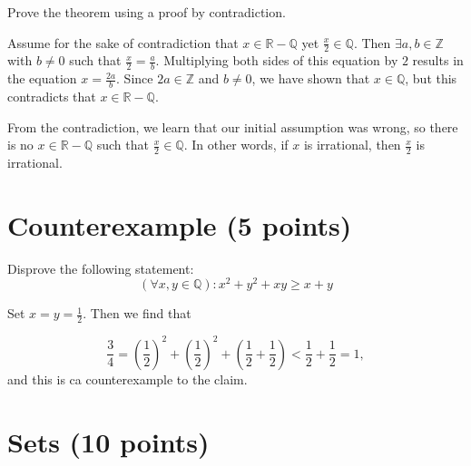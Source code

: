 \documentclass[11pt]{article}
\def\Q{\mathbb{Q}}
\def\sectionOneA#1{}
\def\sectionOneB#1{}
\def\sectionTwoA#1{}
\def\sectionTwoB#1{}
\def\sectionVicsection#1{#1}
\newcounter{pgpts}
\newcounter{cumpts}
\newcommand{\cnewpage}{\addtocounter{cumpts}{\value{pgpts}}\newpage\setcounter{pgpts}{0}}
\begin{document}
Prove the theorem using a proof by \sectionOneA{contrapositive}\sectionOneB{contrapositive}\sectionTwoA{contradiction}\sectionTwoB{contradiction}\sectionVicsection{contradiction}.

\vspace*{2cm}
Assume for the sake of contradiction that $x\in \mathbb{R}-\mathbb{Q}$ yet $\frac{x}{2}\in \mathbb{Q}$. Then $\exists a,b\in \mathbb{Z}$ with $b\neq 0$ such that $\frac{x}{2}=\frac{a}{b}$. Multiplying both sides of this equation by $2$ results in the equation $x=\frac{2a}{b}$. Since $2a\in \mathbb{Z}$ and $b\neq 0$, we have shown that $x\in \mathbb{Q}$, but this contradicts that $x\in \mathbb{R}-\mathbb{Q}$.

\vspace*{1cm}

From the contradiction, we learn that our initial assumption was wrong, so there is no $x\in \mathbb{R}-\mathbb{Q}$ such that $\frac{x}{2}\in \mathbb{Q}$. In other words, if $x$ is irrational, then $\frac{x}{2}$ is irrational.
\vspace*{6cm}


\section{Counterexample (5 points)}\addtocounter{pgpts}{5}
Disprove the following statement:\\
\sectionOneA{$$\forall x,y\in \Q^+: \sqrt{x+y}\not\in\Q^+$$}
\sectionOneB{$$\forall x,y\in \Q^+: \sqrt{x*y}\not\in\Q^+$$} %
\sectionTwoA{$$\forall x,y\in \Q^+: \sqrt{x+y}\not\in\Q^+$$}
\sectionTwoB{$$\forall x,y\in \Q^+: \sqrt{x*y}\not\in\Q^+$$} %
\sectionVicsection{$$ (\forall x,y \in \mathbb{Q}): x^2 + y^2 +xy \geq x+y$$}

Set $x=y=\frac{1}{2}$. Then we find that

\[
\frac{3}{4}=(\frac{1}{2})^2 + (\frac{1}{2})^2  + (\frac{1}{2}+\frac{1}{2}) < \frac{1}{2}+\frac{1}{2}=1,
\]
and this is ca counterexample to the claim.
\cnewpage

\section{Sets (10 points)}\addtocounter{pgpts}{10}
\end{document}
